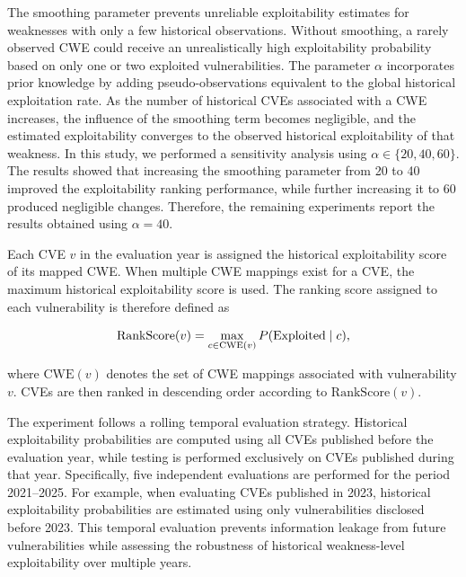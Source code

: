 \documentclass[conference,compsoc]{IEEEtran}
\begin{document}
The smoothing parameter prevents unreliable exploitability estimates for weaknesses with only a few historical observations. Without smoothing, a rarely observed CWE could receive an unrealistically high exploitability probability based on only one or two exploited vulnerabilities. The parameter $\alpha$ incorporates prior knowledge by adding pseudo-observations equivalent to the global historical exploitation rate. As the number of historical CVEs associated with a CWE increases, the influence of the smoothing term becomes negligible, and the estimated exploitability converges to the observed historical exploitability of that weakness. In this study, we performed a sensitivity analysis using $\alpha \in \{20,40,60\}$. The results showed that increasing the smoothing parameter from 20 to 40 improved the exploitability ranking performance, while further increasing it to 60 produced negligible changes. Therefore, the remaining experiments report the results obtained using $\alpha=40$.

Each CVE $v$ in the evaluation year is assigned the historical exploitability score of its mapped CWE. When multiple CWE mappings exist for a CVE, the maximum historical exploitability score is used. The ranking score assigned to each vulnerability is therefore defined as

\begin{equation}
\small
\mathrm{RankScore}(v)=
\max_{c \in \mathrm{CWE}(v)}
P(\mathrm{Exploited}\mid c),
\label{eq:ranking_score}
\end{equation}

where $\mathrm{CWE}(v)$ denotes the set of CWE mappings associated with vulnerability $v$. CVEs are then ranked in descending order according to $\mathrm{RankScore}(v)$.


The experiment follows a rolling temporal evaluation strategy. Historical exploitability probabilities are computed using all CVEs published before the evaluation year, while testing is performed exclusively on CVEs published during that year. Specifically, five independent evaluations are performed for the period 2021--2025. For example, when evaluating CVEs published in 2023, historical exploitability probabilities are estimated using only vulnerabilities disclosed before 2023. This temporal evaluation prevents information leakage from future vulnerabilities while assessing the robustness of historical weakness-level exploitability over multiple years.
\end{document}
